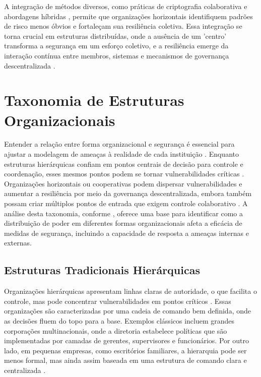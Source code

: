 A integração de métodos diversos, como práticas de criptografia
colaborativa \cite{AbcCrypto} e abordagens híbridas \cite{CoReTM}, permite
que organizações horizontais identifiquem padrões de risco menos óbvios e
fortaleçam sua resiliência coletiva. Essa integração se torna crucial em
estruturas distribuídas, onde a ausência de um 'centro' transforma a
segurança em um esforço coletivo, e a resiliência emerge da interação
contínua entre membros, sistemas e mecanismos de governança
descentralizada \cite{Reputation-basedDAO}.

\section{Taxonomia de Estruturas Organizacionais}
\label{sec:taxonomia_de_estruturas_organizacionais}

Entender a relação entre forma organizacional e segurança é essencial para
ajustar a modelagem de ameaças à realidade de cada instituição \cite{Non-HierarchicalForms}.
Enquanto estruturas hierárquicas confiam em pontos centrais de decisão para controle
e coordenação, esses mesmos pontos podem se tornar vulnerabilidades
críticas \cite{ThreatModelingdesigningForSecurity}. Organizações horizontais ou cooperativas podem
dispersar vulnerabilidades e aumentar a resiliência por meio da governança
descentralizada, embora também possam criar múltiplos pontos de entrada que
exigem controle colaborativo \cite{Colbac}. A análise desta taxonomia, conforme
\cite{WorkerCooperativesinAmerica, RealNotNominalGlobalDemocracy}, oferece
uma base para identificar como a distribuição de poder em diferentes formas
organizacionais afeta a eficácia de medidas de segurança, incluindo a
capacidade de resposta a ameaças internas e externas.

\subsection{Estruturas Tradicionais Hierárquicas}
\label{sec:estruturas_tradicionais_hierarquicas}

Organizações hierárquicas apresentam linhas claras de autoridade, o que
facilita o controle, mas pode concentrar vulnerabilidades em pontos
críticos \cite{MicrosoftThreatModelingTechnique}. Essas organizações são caracterizadas por uma cadeia de comando
bem definida, onde as decisões fluem do topo para a base. Exemplos
clássicos incluem grandes corporações multinacionais, onde a diretoria
estabelece políticas que são implementadas por camadas de gerentes,
supervisores e funcionários. Por outro lado, em pequenas empresas, como
escritórios familiares, a hierarquia pode ser menos formal, mas ainda assim
baseada em uma estrutura de comando clara e centralizada \cite{WorkerCooperativesinAmerica}.

